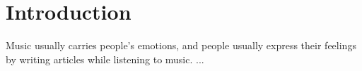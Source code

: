 \chapter{Introduction}
Music usually carries people's emotions, and people usually express their
feelings by writing articles while listening to music.  ...
